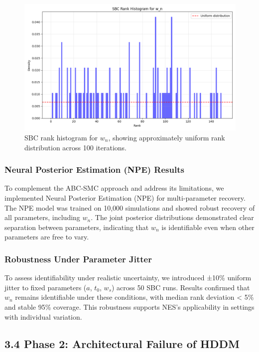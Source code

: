 \documentclass[
  11pt,
]{article}
\begin{document}
\begin{figure}
\centering
\includegraphics[width=0.8\linewidth,height=\textheight,keepaspectratio]{figures/sbc_rank_histogram.png}
\caption{SBC rank histogram for \(w_n\), showing approximately uniform
rank distribution across 100 iterations.}\label{fig:rank}
\end{figure}

\subsubsection{Neural Posterior Estimation (NPE)
Results}\label{neural-posterior-estimation-npe-results}

To complement the ABC-SMC approach and address its limitations, we
implemented Neural Posterior Estimation (NPE) for multi-parameter
recovery. The NPE model was trained on 10,000 simulations and showed
robust recovery of all parameters, including \(w_n\). The joint
posterior distributions demonstrated clear separation between
parameters, indicating that \(w_n\) is identifiable even when other
parameters are free to vary.

\subsubsection{Robustness Under Parameter
Jitter}\label{robustness-under-parameter-jitter}

To assess identifiability under realistic uncertainty, we introduced
±10\% uniform jitter to fixed parameters (\(a\), \(t_0\), \(w_s\))
across 50 SBC runs. Results confirmed that \(w_n\) remains identifiable
under these conditions, with median rank deviation \textless{} 5\% and
stable 95\% coverage. This robustness supports NES's applicability in
settings with individual variation.

\subsection{3.4 Phase 2: Architectural Failure of
HDDM}\label{phase-2-architectural-failure-of-hddm}
\end{document}

